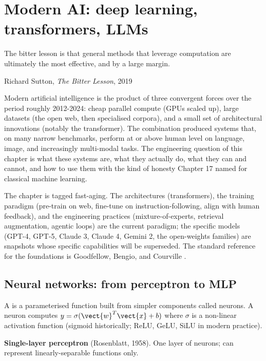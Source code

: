\chapter{Modern AI: deep learning, transformers, LLMs}
\label{vol07:ch18}

\epigraph{The bitter lesson is that general methods that leverage computation are ultimately the most effective, and by a large margin.}{Richard Sutton, \emph{The Bitter Lesson}, 2019}


\noindent
Modern artificial intelligence is the product of three convergent forces over the period roughly 2012-2024: cheap parallel compute (GPUs scaled up), large datasets (the open web, then specialised corpora), and a small set of architectural innovations (notably the transformer). The combination produced systems that, on many narrow benchmarks, perform at or above human level on language, image, and increasingly multi-modal tasks. The engineering question of this chapter is what these systems are, what they actually do, what they can and cannot, and how to use them with the kind of honesty Chapter 17 named for classical machine learning.

The chapter is tagged fast-aging. The architectures (transformers), the training paradigm (pre-train on web, fine-tune on instruction-following, align with human feedback), and the engineering practices (mixture-of-experts, retrieval augmentation, agentic loops) are the current paradigm; the specific models (GPT-4, GPT-5, Claude 3, Claude 4, Gemini 2, the open-weights families) are snapshots whose specific capabilities will be superseded. The standard reference for the foundations is Goodfellow, Bengio, and Courville \cite{text:goodfellow-deep-learning}.

\section{Neural networks: from perceptron to MLP}

A  is a parameterised function built from simpler components called neurons. A neuron computes $y = \sigma(\vect{w}^T \vect{x} + b)$ where $\sigma$ is a non-linear activation function (sigmoid historically; ReLU, GeLU, SiLU in modern practice).

\textbf{Single-layer perceptron} (Rosenblatt, 1958). One layer of neurons; can represent linearly-separable functions only.

